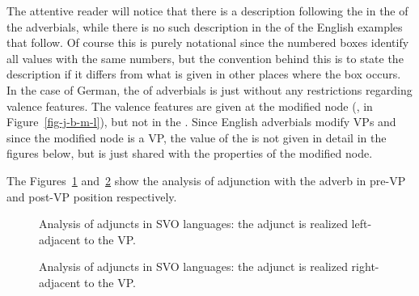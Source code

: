 The attentive reader will notice that there is a description following the  in the \modv of
the adverbials, while there is no such description in the \modvs of the English examples that
follow. Of course this is purely notational since the numbered boxes identify all values with the
same numbers, but the convention behind this is to state the description if it differs from what is
given in other places where the box occurs. In the case of German, the \modv of adverbials is just
 without any restrictions regarding valence features. The valence features are given at
the modified node (\eg \spr \eliste, \comps {} in
Figure~\ref{fig-j-b-m-l}), but not in the \modv. Since English adverbials modify VPs and since the
modified node is a VP, the value of the \modv is not given in detail in the figures below, but is just shared with the
properties of the modified node.


The Figures~\ref{fig-adj-vp} and~\ref{fig-vp-adj} show the analysis of adjunction with the adverb in
pre-VP and post-VP position respectively.
\begin{figure}
\caption{\label{fig-adj-vp}Analysis of adjuncts in SVO languages: the adjunct is realized left-adjacent to the VP.}
\end{figure}
\begin{figure}
\caption{\label{fig-vp-adj}Analysis of adjuncts in SVO languages: the adjunct is realized right-adjacent to the VP.}
\end{figure}

